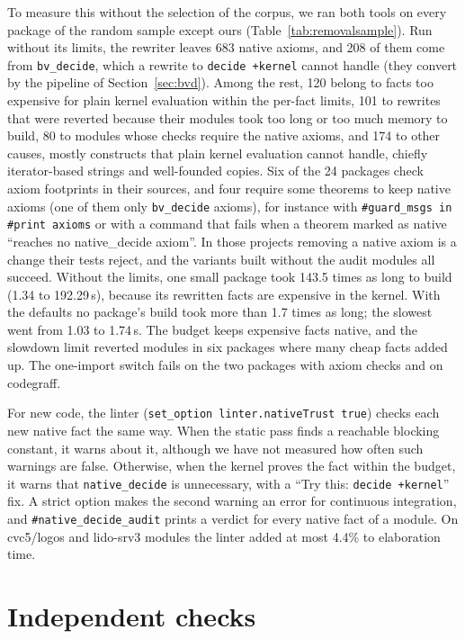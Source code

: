 \documentclass[11pt]{article}
\begin{document}
To measure this without the selection of the corpus, we ran both tools on every package of the random
sample except ours (Table~\ref{tab:removalsample}). Run without its limits, the rewriter leaves
683 native axioms, and 208 of them come from \texttt{bv\_decide}, which
a rewrite to \texttt{decide +kernel} cannot handle (they convert by the pipeline of Section~\ref{sec:bvd}).
Among the rest, 120 belong to facts too expensive for plain kernel evaluation within the per-fact
limits, 101 to rewrites that were reverted because their modules took too long or too much memory to
build, 80 to modules whose checks require the native axioms, and 174 to other causes, mostly
constructs that plain kernel evaluation cannot handle, chiefly iterator-based strings and well-founded copies. Six of the 24 packages check axiom footprints in their sources,
and four require some theorems to keep native axioms (one of them only \texttt{bv\_decide} axioms), for instance with
\verb|#guard_msgs in #print axioms| or with a command that fails when a theorem marked as native
``reaches no native\_decide axiom''. In those projects removing a native axiom is a change their
tests reject, and the variants built without the audit modules all succeed. Without the limits, one small package took
143.5 times as long to build (1.34 to 192.29\,s), because its rewritten facts are expensive in the kernel. With the defaults no
package's build took more than 1.7 times as long; the slowest went from 1.03 to 1.74\,s. The
budget keeps expensive facts native, and the slowdown limit reverted modules in six packages where many
cheap facts added up. The one-import switch fails on the
two packages with axiom checks and on codegraff.

For new code, the linter (\verb|set_option linter.nativeTrust true|) checks each new native fact the same
way. When the static pass finds a reachable blocking constant, it warns about it, although we have not measured
how often such warnings are false. Otherwise, when the kernel proves the fact within the budget, it warns that
\texttt{native\_decide} is unnecessary, with a ``Try this: \texttt{decide +kernel}'' fix. A strict option makes
the second warning an error for continuous integration, and \verb|#native_decide_audit| prints a verdict for
every native fact of a module. On cvc5/logos and lido-srv3 modules the linter added at most 4.4\% to
elaboration time.

\section{Independent checks}\label{sec:checks}
\end{document}
